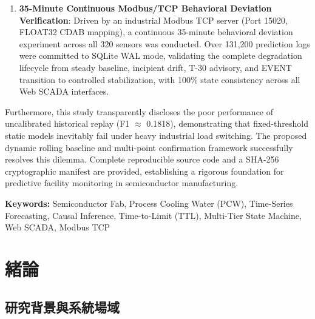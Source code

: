 \documentclass[fontset=none, a4paper, 12pt]{ctexart}
\begin{document}
{\begin{enumerate}
    \item \textbf{35-Minute Continuous Modbus/TCP Behavioral Deviation Verification}: Driven by an industrial Modbus TCP server (Port 15020, FLOAT32 CDAB mapping), a continuous 35-minute behavioral deviation experiment across all 320 sensors was conducted. Over 131,200 prediction logs were committed to SQLite WAL mode, validating the complete degradation lifecycle from steady baseline, incipient drift, T-30 advisory, and EVENT transition to controlled stabilization, with 100\% state consistency across all Web SCADA interfaces.
\end{enumerate}

Furthermore, this study transparently discloses the poor performance of uncalibrated historical replay (F1 $\approx$ 0.1818), demonstrating that fixed-threshold static models inevitably fail under heavy industrial load switching. The proposed dynamic rolling baseline and multi-point confirmation framework successfully resolves this dilemma. Complete reproducible source code and a SHA-256 cryptographic manifest are provided, establishing a rigorous foundation for predictive facility monitoring in semiconductor manufacturing.
\par}

\vspace{0.8cm}
\noindent\textbf{Keywords:} Semiconductor Fab, Process Cooling Water (PCW), Time-Series Forecasting, Causal Inference, Time-to-Limit (TTL), Multi-Tier State Machine, Web SCADA, Modbus TCP

\newpage
{}
\tableofcontents
\newpage
\listoftables
\newpage
\listoffigures

\newpage
{}
\setcounter{page}{1}

\section{緒論}

\subsection{研究背景與系統場域}
\end{document}
